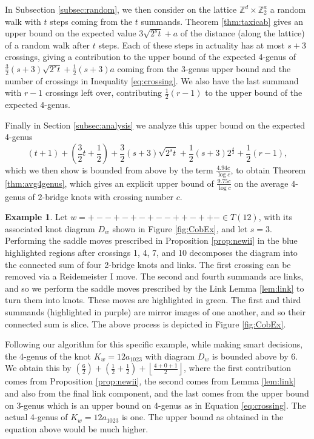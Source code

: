 \documentclass[12pt]{amsart}
\theoremstyle{definition}
\newtheorem{example}[theorem]{Example}
\theoremstyle{remark}
\numberwithin{equation}{section}
\begin{document}
In Subsection \ref{subsec:random}, we then consider on the lattice $\mathbb{Z}^d\times\mathbb{Z}^a_2$ a random walk with $t$ steps coming from the $t$ summands.  
Theorem \ref{thm:taxicab} gives an upper bound on the expected value $3 \sqrt{2^s t}+a$ of the distance (along the lattice) of a random walk after $t$ steps.  Each of these steps in actuality has at most $s+3$ crossings, giving a contribution to the upper bound of the expected 4-genus of $\frac{3}{2}(s+3)\sqrt{2^st}+\frac{1}{2}(s+3)a$ coming from the 3-genus upper bound and the number of crossings in Inequality \ref{eq:crossing}.  We also have the last summand with $r-1$ crossings left over, contributing $\frac{1}{2}(r-1)$ to the upper bound of the expected 4-genus.


Finally in Section \ref{subsec:analysis} we analyze this upper bound on the expected 4-genus
\[(t+1) +\left(\frac{3}{2}t  + \frac{1}{2}\right)+\frac{3}{2} (s+3)\sqrt{2^st}+\frac{1}{2} (s+3)2^{\frac{s}{2}}+\frac{1}{2}(r-1),\]
which we then show is bounded from above by the term $\frac{4.94c}{\log c}$, to obtain Theorem \ref{thm:avg4genus}, which gives an explicit upper bound of $\frac{9.75 c}{\log c}$ on the average $4$-genus of $2$-bridge knots with crossing number $c$.

\begin{example}
\label{ex:cobordism}
    Let $w=+--+-+-+--++-++-\in T(12)$, with its associated knot diagram $D_w$ shown in Figure \ref{fig:CobEx}, and let $s=3$.  Performing the saddle moves prescribed in Proposition \ref{prop:newii} in the blue highlighted regions after crossings 1, 4, 7, and 10 decomposes the diagram into the connected sum of four 2-bridge knots and links. The first crossing can be removed via a Reidemeister I move. The second and fourth summands are links, and so we perform the saddle moves prescribed by the Link Lemma \ref{lem:link} to turn them into knots. These moves are highlighted in green. The first and third summands (highlighted in purple) are mirror images of one another, and so their connected sum is slice. The above process is depicted in Figure \ref{fig:CobEx}.

    Following our algorithm for this specific example, while making smart decisions, the 4-genus of the knot $K_w=12a_{1023}$ with diagram $D_w$ is bounded above by 6.  We obtain this by $\left(\frac{6}{2}\right)+\left(\frac{1}{2}+\frac{1}{2}\right)+\left\lfloor\frac{4+0+1}{2}\right\rfloor$, where the first contribution comes from Proposition \ref{prop:newii}, the second comes from Lemma \ref{lem:link} and also from the final link component, and the last comes from the upper bound on 3-genus which is an upper bound on 4-genus as in Equation \eqref{eq:crossing}.  The actual 4-genus of $K_w=12a_{1023}$ is one.  The upper bound as obtained in the equation above would be much higher.  
\end{example}
\end{document}
